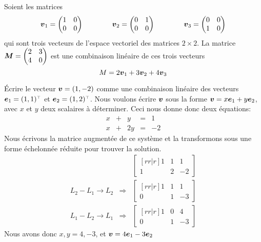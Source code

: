 \begin{exemple}
Soient les matrices 
\[
\boldsymbol{v}_1 = \begin{pmatrix}
1 & 0 \\
0 & 0
\end{pmatrix}
\qquad\qquad
\boldsymbol{v}_2 = \begin{pmatrix}
0 & 1 \\
0 & 0
\end{pmatrix}
\qquad\qquad
\boldsymbol{v}_3 = \begin{pmatrix}
0 & 0 \\
1 & 0
\end{pmatrix}
\]
qui sont trois vecteurs de l'espace vectoriel des matrices $2\times 2$.  La
matrice $\displaystyle \boldsymbol{M} = \begin{pmatrix}
2 & 3 \\
4 & 0
\end{pmatrix}
$
est une combinaison linéaire de ces trois vecteurs
\[
M = 2\boldsymbol{v}_1 + 3 \boldsymbol{v}_2 + 4\boldsymbol{v}_3
\]
\end{exemple}

\begin{exemple}
Écrire le vecteur $ \boldsymbol{v} = (1, -2)$ comme une combinaison linéaire des vecteurs 
$\mat{e}_1 = \transp{(1, 1)}$ et $\mat{e}_2 = \transp{(1, 2)}$.
\solution
Nous voulons écrire $\boldsymbol{v}$ sous la forme $\boldsymbol{v} = x\boldsymbol{e}_1 + y\boldsymbol{e}_2$,
avec $x$ et $y$ deux scalaires à déterminer.  Ceci nous donne donc deux équations:
\[
\begin{matrix}
x &+& y &=& 1 \\
x &+& 2y &=& -2
\end{matrix}
\]
Nous écrivons la matrice augmentée de ce système et la transformons sous une forme
échelonnée réduite pour trouver la solution.
\[
\begin{matrix}
    &&\begin{bmatrix}[rr|r]
    1 & 1 & 1 \\
    1 & 2 & -2
    \end{bmatrix} \\[25pt]
    L_2 - L_1 \rightarrow L_2 &\Rightarrow &
    \begin{bmatrix}[rr|r]
    1 & 1 & 1 \\
    0 & 1 & -3
    \end{bmatrix} \\[25pt]
     L_1 - L_2 \rightarrow L_1 &\Rightarrow &
    \begin{bmatrix}[rr|r]
    1 & 0 & 4 \\
    0 & 1 & -3
    \end{bmatrix}
\end{matrix}
\]
Nous avons donc $x,y = 4,-3$, et  $\boldsymbol{v} = 4\boldsymbol{e}_1 -3\boldsymbol{e}_2$
\end{exemple}

